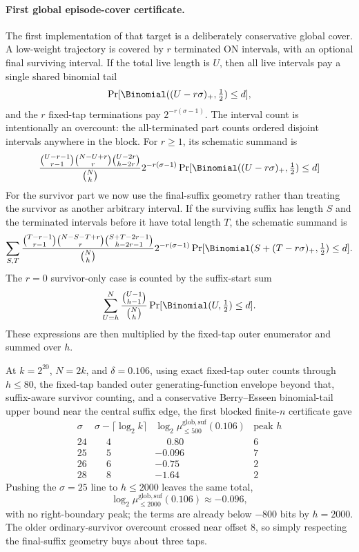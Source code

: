 \paragraph{First global episode-cover certificate.}
The first implementation of that target is a deliberately conservative global cover.  A low-weight trajectory is
covered by \(r\) terminated ON intervals, with an optional final surviving interval.  If the total live length is \(U\),
then all live intervals pay a single shared binomial tail
\[
\Pr[\Binomial((U-r\sigma)_+,\tfrac12)\le d],
\]
and the \(r\) fixed-tap terminations pay \(2^{-r(\sigma-1)}\).  The interval count is intentionally an overcount:
the all-terminated part counts ordered disjoint intervals anywhere in the block.  For \(r\ge1\), its schematic summand
is
\[
\frac{
\binom{U-r-1}{r-1}
\binom{N-U+r}{r}
\binom{U-2r}{h-2r}
}{\binom{N}{h}}
2^{-r(\sigma-1)}
\Pr[\Binomial((U-r\sigma)_+,\tfrac12)\le d]
\]
For the survivor part we now use the final-suffix geometry rather than treating the survivor as another arbitrary
interval.  If the surviving suffix has length \(S\) and the terminated intervals before it have total length \(T\), the
schematic summand is
\[
\sum_{S,T}
\frac{
\binom{T-r-1}{r-1}
\binom{N-S-T+r}{r}
\binom{S+T-2r-1}{h-2r-1}
}{\binom{N}{h}}
2^{-r(\sigma-1)}
\Pr[\Binomial(S+(T-r\sigma)_+,\tfrac12)\le d].
\]
The \(r=0\) survivor-only case is counted by the suffix-start
sum
\[
\sum_{U=h}^{N}
\frac{\binom{U-1}{h-1}}{\binom{N}{h}}
\Pr[\Binomial(U,\tfrac12)\le d].
\]
These expressions are then multiplied by the fixed-tap outer enumerator and summed over \(h\).

At \(k=2^{20}\), \(N=2k\), and \(\delta=0.106\), using exact fixed-tap outer counts through \(h\le80\), the fixed-tap
banded outer generating-function envelope beyond that, suffix-aware survivor counting, and a conservative
Berry--Esseen binomial-tail upper bound near the central suffix edge, the first blocked finite-\(n\) certificate gave
\[
\begin{array}{c|c|c|c}
\sigma & \sigma-\lceil\log_2 k\rceil & \log_2\mu_{\le500}^{\mathrm{glob,suf}}(0.106) & \text{peak }h\\
\hline
24 & \phantom{-}4 & \phantom{-}0.80 & 6\\
25 & \phantom{-}5 & -0.096 & 7\\
26 & \phantom{-}6 & -0.75 & 2\\
28 & \phantom{-}8 & -1.64 & 2
\end{array}
\]
Pushing the \(\sigma=25\) line to \(h\le2000\) leaves the same total,
\[
\log_2\mu_{\le2000}^{\mathrm{glob,suf}}(0.106)\approx -0.096,
\]
with no right-boundary peak; the terms are already below \(-800\) bits by \(h=2000\).  The older ordinary-survivor
overcount crossed near offset \(8\), so simply respecting the final-suffix geometry buys about three taps.

